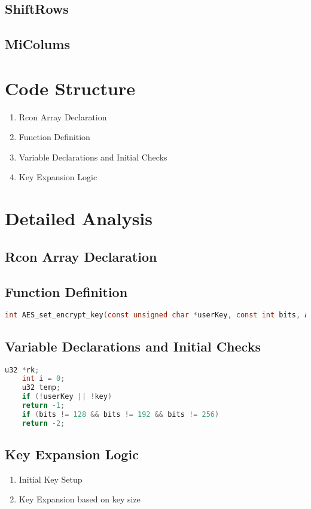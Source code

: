 \subsection{ShiftRows}
\subsection{MiColums}

\newpage
\section{Code Structure}
\begin{enumerate}
	\item Rcon Array Declaration
	\item Function Definition
	\item Variable Declarations and Initial Checks
	\item Key Expansion Logic
\end{enumerate}

\section{Detailed Analysis}
\subsection{Rcon Array Declaration}


\subsection{Function Definition}
\begin{lstlisting}[language=C]
	int AES_set_encrypt_key(const unsigned char *userKey, const int bits, AES_KEY *key);
\end{lstlisting}

\subsection{Variable Declarations and Initial Checks}
\begin{lstlisting}[language=C]
	u32 *rk;
	int i = 0;
	u32 temp;
	if (!userKey || !key)
	return -1;
	if (bits != 128 && bits != 192 && bits != 256)
	return -2;
\end{lstlisting}

\subsection{Key Expansion Logic}
\begin{enumerate}
	\item Initial Key Setup
	\item Key Expansion based on key size
\end{enumerate}

